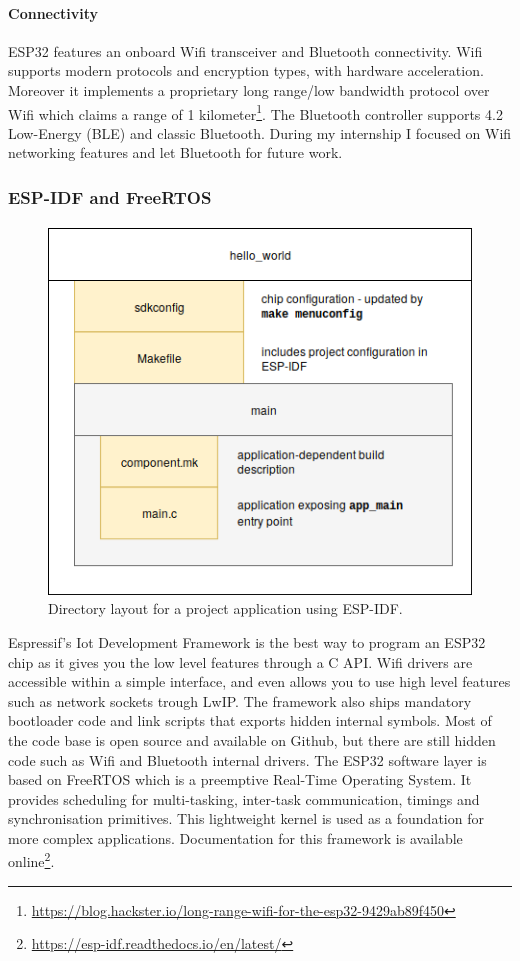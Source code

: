 \documentclass[a4paper]{article}
\begin{document}
\paragraph{Connectivity} ESP32 features an onboard Wifi transceiver and Bluetooth connectivity. Wifi supports modern protocols and encryption types, with hardware acceleration. Moreover it implements a proprietary long range/low bandwidth protocol over Wifi which claims a range of 1 kilometer\footnote{\url{https://blog.hackster.io/long-range-wifi-for-the-esp32-9429ab89f450}}. The Bluetooth controller supports 4.2 Low-Energy (BLE) and classic Bluetooth. During my internship I focused on Wifi networking features and let Bluetooth for future work.
\subsubsection{ESP-IDF and FreeRTOS}
\paragraph{} 
\begin{figure}
\includegraphics[width=\columnwidth/2]{ESP-IDF.png}
\caption{Directory layout for a project application using ESP-IDF.}
\end{figure}
Espressif's Iot Development Framework is the best way to program an ESP32 chip as it gives you the low level features through a C API. Wifi drivers are accessible within a simple interface, and even allows you to use high level features such as network sockets trough LwIP. The framework also ships mandatory bootloader code and link scripts that exports hidden internal symbols. Most of the code base is open source and available on Github, but there are still hidden code such as Wifi and Bluetooth internal drivers. 
The ESP32 software layer is based on FreeRTOS which is a preemptive Real-Time Operating System. It provides scheduling for multi-tasking, inter-task communication, timings and synchronisation primitives. This lightweight kernel is used as a foundation for more complex applications. Documentation for this framework is available online\footnote{\url{https://esp-idf.readthedocs.io/en/latest/}}.
\end{document}
